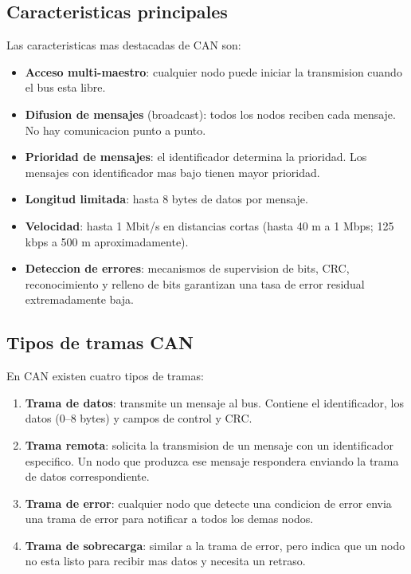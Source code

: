 \subsection{Caracteristicas principales}

Las caracteristicas mas destacadas de CAN son:

\begin{itemize}
    \item \textbf{Acceso multi-maestro}: cualquier nodo puede iniciar la
    transmision cuando el bus esta libre.
    \item \textbf{Difusion de mensajes} (broadcast): todos los nodos reciben cada
    mensaje. No hay comunicacion punto a punto.
    \item \textbf{Prioridad de mensajes}: el identificador determina la prioridad.
    Los mensajes con identificador mas bajo tienen mayor prioridad.
    \item \textbf{Longitud limitada}: hasta 8 bytes de datos por mensaje.
    \item \textbf{Velocidad}: hasta 1 Mbit/s en distancias cortas (hasta 40 m a 1
    Mbps; 125 kbps a 500 m aproximadamente).
    \item \textbf{Deteccion de errores}: mecanismos de supervision de bits,
    CRC, reconocimiento y relleno de bits garantizan una tasa de error
    residual extremadamente baja.
\end{itemize}

\subsection{Tipos de tramas CAN}

En CAN existen cuatro tipos de tramas:

\begin{enumerate}
    \item \textbf{Trama de datos}: transmite un mensaje al bus. Contiene el
    identificador, los datos (0--8 bytes) y campos de control y CRC.
    \item \textbf{Trama remota}: solicita la transmision de un mensaje con un
    identificador especifico. Un nodo que produzca ese mensaje respondera
    enviando la trama de datos correspondiente.
    \item \textbf{Trama de error}: cualquier nodo que detecte una condicion de
    error envia una trama de error para notificar a todos los demas nodos.
    \item \textbf{Trama de sobrecarga}: similar a la trama de error, pero indica
    que un nodo no esta listo para recibir mas datos y necesita un retraso.
\end{enumerate}

